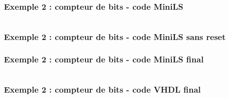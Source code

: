 \documentclass{beamer}
\begin{document}
\begin{frame}
  \frametitle{Exemple 2 : compteur de bits - code MiniLS}

  \tiny

  \begin{columns}[t]
    \hspace{1cm}
    \begin{column}{6cm}
      
    \end{column}
    \begin{column}{6cm}
      
    \end{column}
  \end{columns}
\end{frame}

\begin{frame}
  \frametitle{Exemple 2 : compteur de bits - code MiniLS sans reset}
  \tiny
  
\end{frame}

\begin{frame}
  \frametitle{Exemple 2 : compteur de bits - code MiniLS final}
  \tiny
  \begin{columns}[t]
    \hspace{1cm}
    \begin{column}{6cm}
      
    \end{column}
    \begin{column}{6cm}
      
    \end{column}
  \end{columns}
\end{frame}

\begin{frame}
  \frametitle{Exemple 2 : compteur de bits - code VHDL final}
  \tiny
  \begin{columns}[t]
    \hspace{1cm}
    \begin{column}{6cm}
      
    \end{column}
    \begin{column}{6cm}
      
    \end{column}
  \end{columns}
\end{frame}
\end{document}

